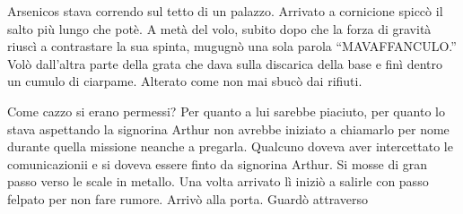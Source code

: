     Arsenicos stava correndo sul tetto di un palazzo. Arrivato a cornicione spiccò il salto più lungo che potè. A metà
    del volo, subito dopo che la forza di gravità riuscì a contrastare la sua spinta, mugugnò una sola parola
    ``MAVAFFANCULO.'' Volò dall'altra parte della grata che dava sulla discarica della base e finì dentro un cumulo di
    ciarpame. Alterato come non mai sbucò dai rifiuti.

    Come cazzo si erano permessi? Per quanto a lui sarebbe piaciuto, per quanto lo stava aspettando la signorina Arthur
    non avrebbe iniziato a chiamarlo per nome durante quella missione neanche a pregarla. Qualcuno doveva aver
    intercettato le comunicazionii e si doveva essere finto da signorina Arthur. Si mosse di gran passo verso
    le scale in metallo. Una volta arrivato lì iniziò a salirle con passo felpato per non fare rumore. Arrivò alla
    porta. Guardò attraverso 
